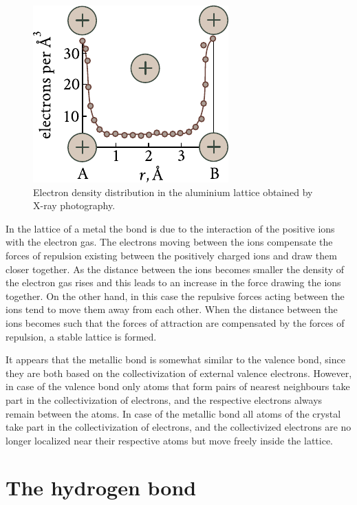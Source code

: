 \begin{figure}[t]
	\begin{center}
		\includegraphics[scale=0.85]{figures/ch_01/fig_1_8.pdf}
		\caption[]{Electron density distribution in the aluminium lattice obtained by X-ray photography.}
		\label{fig:1_8}
	\end{center}
	\vspace{-0.7cm}
\end{figure}

In the lattice of a metal the bond is due to the interaction of the positive ions with the electron gas. The electrons moving between the ions compensate the forces of repulsion existing between the positively charged ions and draw them closer together. As the distance between the ions becomes smaller the density of the electron gas rises and this leads to an increase in the force drawing the ions together. On the other hand, in this case the repulsive forces acting between the ions tend to move them away from each other. When the distance between the ions becomes such that the forces of attraction are compensated by the forces of repulsion, a stable lattice is formed.

It appears that the metallic bond is somewhat similar to the valence bond, since they are both based on the collectivization of external valence electrons. However, in case of the valence bond only atoms that form pairs of nearest neighbours take part in the collectivization of electrons, and the respective electrons always remain between the atoms. In case of the metallic bond all atoms of the crystal take part in the collectivization of electrons, and the collectivized electrons are no longer localized near their respective atoms but move freely inside the lattice.

\section{The hydrogen bond}\label{sec:5}

